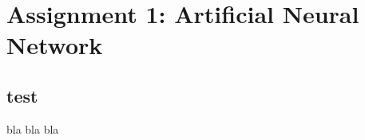 \section{Assignment 1: Artificial Neural Network} \label {chapter:assignment_1}

\subsection{test}
bla bla bla